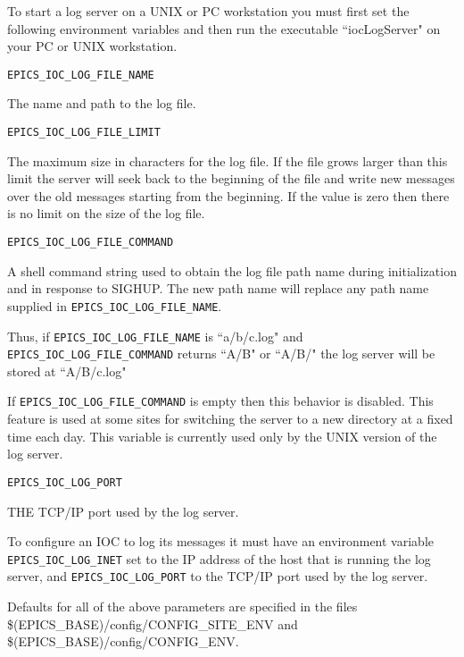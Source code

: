 To start a log server on a UNIX or PC workstation you must first set the following environment variables and then run the executable ``iocLogServer" on your PC or UNIX workstation.

\begin{description}

\item {}\verb|EPICS_IOC_LOG_FILE_NAME|

The name and path to the log file.

\item {}\verb|EPICS_IOC_LOG_FILE_LIMIT|

The maximum size in characters for the log file.
If the file grows larger than this limit the server will seek back to the beginning of the file and write new messages over the old messages starting from the beginning.
If the value is zero then there is no limit on the size of the log file.

\item {}\verb|EPICS_IOC_LOG_FILE_COMMAND|

A shell command string used to obtain the log file path name during initialization and in response to SIGHUP.
The new path name will replace any path name supplied in \verb|EPICS_IOC_LOG_FILE_NAME|.

Thus, if \verb|EPICS_IOC_LOG_FILE_NAME| is ``a/b/c.log" and \verb|EPICS_IOC_LOG_FILE_COMMAND| returns ``A/B" or ``A/B/" the log server will be stored at ``A/B/c.log"

If \verb|EPICS_IOC_LOG_FILE_COMMAND| is empty then this behavior is disabled.
This feature is used at some sites for switching the server to a new directory at a fixed time each day.
This variable is currently used only by the UNIX version of the log server.

\item {}\verb|EPICS_IOC_LOG_PORT|

THE TCP/IP port used by the log server.

\end{description}

To configure an IOC to log its messages it must have an environment variable \verb|EPICS_IOC_LOG_INET| set to the IP address of the host that is running the log server, and \verb|EPICS_IOC_LOG_PORT| to the TCP/IP port used by the log server.

Defaults for all of the above parameters are specified in  the files \$(EPICS\_BASE)/config/CONFIG\_SITE\_ENV and \$(EPICS\_BASE)/config/CONFIG\_ENV.

